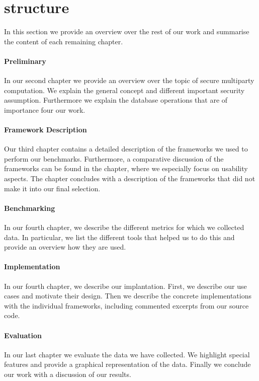 \section{structure}
In this section we provide an overview over the rest of our work and summarise the content of each remaining chapter.
\paragraph{Preliminary}
In our second chapter we provide an overview over the topic of secure multiparty computation. We explain the general concept and different important security assumption. Furthermore we explain the database operations that are of importance four our work. 
\paragraph{Framework Description}
Our third chapter contains a detailed description of the frameworks we used to perform our benchmarks. Furthermore, a comparative discussion of the frameworks can be found in the chapter, where we especially focus on usability aspects. The chapter concludes with a description of the frameworks that did not make it into our final selection. 
\paragraph{Benchmarking}
In our fourth chapter, we describe the different metrics for which we collected data. In particular, we list the different tools that helped us to do this and provide an overview how they are used. 
\paragraph{Implementation}
In our fourth chapter, we describe our implantation. First, we describe our use cases and motivate their design.  Then we describe the concrete implementations with the individual frameworks, including commented excerpts from our source code.
\paragraph{Evaluation}
In our last chapter we evaluate the data we have collected. We highlight special features and provide a graphical representation of the data. 
Finally we conclude our work with a discussion of our results.
